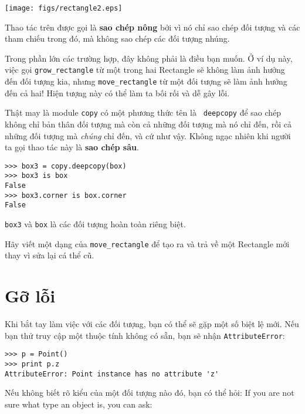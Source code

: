 \documentclass[11pt]{book}
\begin{document}
\vspace{0.1in}
\beforefig
\centerline{\texttt{[image: figs/rectangle2.eps]}}
\afterfig
\vspace{0.1in}

Thao tác trên được gọi là {\bf sao chép nông} bởi vì nó chỉ sao chép 
đối tượng và các tham chiếu trong đó, mà không sao chép các đối tượng nhúng.


Trong phần lớn các trường hợp, đây không phải là điều bạn muốn. Ở ví dụ này,
việc gọi \verb"grow_rectangle" từ một trong hai Rectangle sẽ không làm
ảnh hưởng đến đối tượng kia, nhưng \verb"move_rectangle" từ một đối tượng
sẽ làm ảnh hưởng đến cả hai! Hiện tượng này có thể làm ta bối rối và dễ gây lỗi.


Thật may là module {\tt copy} có một phương thức tên là {\tt
deepcopy} để sao chép không chỉ bản thân đối tượng mà còn cả 
những đối tượng mà nó chỉ đến, rồi cả những đối tượng mà 
{\em chúng} chỉ đến, và cứ như vậy.
Không ngạc nhiên khi người ta gọi thao tác này là {\bf sao chép sâu}.


\beforeverb
\begin{verbatim}
>>> box3 = copy.deepcopy(box)
>>> box3 is box
False
>>> box3.corner is box.corner
False
\end{verbatim}
\afterverb
%
{\tt box3} và {\tt box} là các đối tượng hoàn toàn riêng biệt.


\begin{ex}
Hãy viết một dạng của \verb"move_rectangle" để tạo ra và
trả về một Rectangle mới thay vì sửa lại cá thể cũ.
\end{ex}


\section{Gỡ lỗi}
\label{hasattr}


Khi bắt tay làm việc với các đối tượng, bạn có thể sẽ gặp 
một số biệt lệ mới. Nếu bạn thử truy cập một thuộc tính
không có sẵn, bạn sẽ nhận {\tt AttributeError}:


\beforeverb
\begin{verbatim}
>>> p = Point()
>>> print p.z
AttributeError: Point instance has no attribute 'z'
\end{verbatim}
\afterverb
%
Nếu không biết rõ kiểu của một đối tượng nào đó, bạn có thể hỏi:
If you are not sure what type an object is, you can ask:
\end{document}
